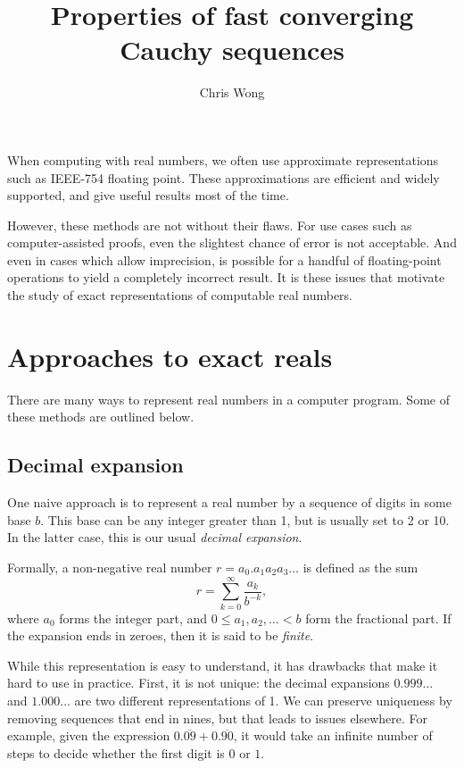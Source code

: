 \documentclass[leqno]{report}
\begin{document}
\author{Chris Wong}
\title{Properties of fast converging Cauchy sequences}
\maketitle

When computing with real numbers, we often use approximate representations such as IEEE-754 floating point. These approximations are efficient and widely supported, and give useful results most of the time.

However, these methods are not without their flaws. For use cases such as computer-assisted proofs, even the slightest chance of error is not acceptable. And even in cases which allow imprecision, is possible for a handful of floating-point operations to yield a completely incorrect result. It is these issues that motivate the study of exact representations of computable real numbers.

\chapter{Approaches to exact reals}

There are many ways to represent real numbers in a computer program. Some of these methods are outlined below.

\section{Decimal expansion}

One naive approach is to represent a real number by a sequence of digits in some base $b$. This base can be any integer greater than 1, but is usually set to 2 or 10. In the latter case, this is our usual \textit{decimal expansion}.

Formally, a non-negative real number $r = a_0 . a_1 a_2 a_3 \ldots$ is defined as the sum
\[
    r = \sum_{k=0}^\infty \frac{a_k}{b^{-k}},
\]
where $a_0$ forms the integer part, and $0 \leq a_1, a_2, \ldots < b$ form the fractional part. If the expansion ends in zeroes, then it is said to be \textit{finite}.

While this representation is easy to understand, it has drawbacks that make it hard to use in practice. First, it is not unique: the decimal expansions $0.999\ldots$ and $1.000\ldots$ are two different representations of 1. We can preserve uniqueness by removing sequences that end in nines, but that leads to issues elsewhere. For example, given the expression $0.\overline{09} + 0.\overline{90}$, it would take an infinite number of steps to decide whether the first digit is $0$ or $1$.
\end{document}
